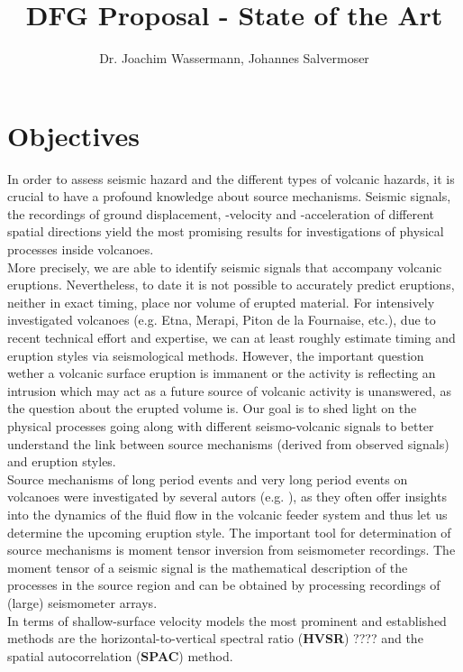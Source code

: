\documentclass[12pt, a4paper]{article}
\title{DFG Proposal - State of the Art}
\author{Dr. Joachim Wassermann, Johannes Salvermoser}
\date{}
\begin{document}
\maketitle



\section*{Objectives}

In order to assess seismic hazard and the different types of volcanic hazards, it is crucial to have a profound knowledge about source mechanisms. Seismic signals, the recordings of ground displacement, -velocity and -acceleration of different spatial directions yield the most promising results for investigations of physical processes inside volcanoes.\\
More precisely, we are able to identify seismic signals that accompany volcanic eruptions. Nevertheless, to date it is not possible to accurately predict eruptions, neither in exact timing, place nor volume of erupted material. For intensively investigated volcanoes (e.g. Etna, Merapi, Piton de la Fournaise, etc.), due to recent technical effort and expertise, we can at least roughly estimate timing and eruption styles via seismological methods. However, the important question wether a volcanic surface eruption is immanent or the activity is reflecting an intrusion which may act as a future source of volcanic activity is unanswered, as the question about the erupted volume is. Our goal is to shed light on the physical processes going along with different seismo-volcanic signals to better understand the link between source mechanisms (derived from observed signals) and eruption styles.\\

Source mechanisms of long period events and very long period events on volcanoes were investigated by several autors (e.g. \citep{Ohminato1998,Chouet2003,Cesca2008,Cannata2009, DeBarros2011}), as they often offer insights into the dynamics of the fluid flow in the volcanic feeder system and thus let us determine the upcoming eruption style. The important tool for determination of source mechanisms is moment tensor inversion from seismometer recordings. The moment tensor of a seismic signal is the mathematical description of the processes in the source region and can be obtained by processing recordings of (large) seismometer arrays.\\
In terms of shallow-surface velocity models the most prominent and established methods are the horizontal-to-vertical spectral ratio (\textbf{HVSR}) ???? and the spatial autocorrelation (\textbf{SPAC}) method.\\
\end{document}
